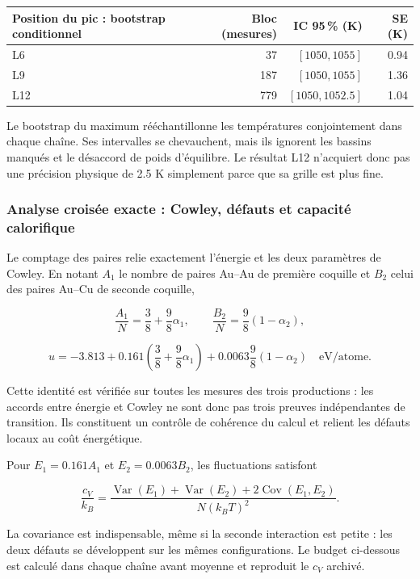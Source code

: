 \begin{center}\small\begin{tabular}{lrrr}\toprule

Position du pic : bootstrap conditionnel & Bloc (mesures) & IC 95\,\% (K) & SE (K)\\\midrule

L6 & 37 & $[1050,1055]$ & 0.94\\

L9 & 187 & $[1050,1055]$ & 1.36\\

L12 & 779 & $[1050,1052.5]$ & 1.04\\

\bottomrule\end{tabular}\end{center}

Le bootstrap du maximum rééchantillonne les températures conjointement dans chaque chaîne. Ses intervalles se chevauchent, mais ils ignorent les bassins manqués et le désaccord de poids d’équilibre. Le résultat L12 n’acquiert donc pas une précision physique de 2.5 K simplement parce que sa grille est plus fine.

\subsubsection{Analyse croisée exacte : Cowley, défauts et capacité calorifique}

Le comptage des paires relie exactement l’énergie et les deux paramètres de Cowley. En notant $A_1$ le nombre de paires Au--Au de première coquille et $B_2$ celui des paires Au--Cu de seconde coquille,

\[\frac{A_1}{N}=\frac38+\frac98\alpha_1,\qquad \frac{B_2}{N}=\frac98(1-\alpha_2),\]

\[u=-3.813+0.161\left(\frac38+\frac98\alpha_1\right)+0.0063\frac98(1-\alpha_2)\quad\mathrm{eV/atome}.\]

Cette identité est vérifiée sur toutes les mesures des trois productions : les accords entre énergie et Cowley ne sont donc pas trois preuves indépendantes de transition. Ils constituent un contrôle de cohérence du calcul et relient les défauts locaux au coût énergétique.

Pour $E_1=0.161A_1$ et $E_2=0.0063B_2$, les fluctuations satisfont

\[\frac{c_V}{k_B}=\frac{\operatorname{Var}(E_1)+\operatorname{Var}(E_2)+2\operatorname{Cov}(E_1,E_2)}{N(k_BT)^2}.\]

La covariance est indispensable, même si la seconde interaction est petite : les deux défauts se développent sur les mêmes configurations. Le budget ci-dessous est calculé dans chaque chaîne avant moyenne et reproduit le $c_V$ archivé.

